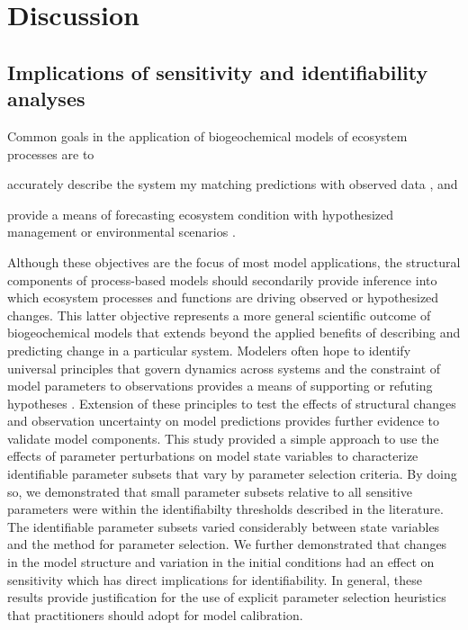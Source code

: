\documentclass[letterpaper,12pt,oneside]{article}\usepackage[]{graphicx}\usepackage[]{color}
\begin{document}
\section{Discussion}

\subsection{Implications of sensitivity and identifiability analyses}

Common goals in the application of biogeochemical models of ecosystem processes are to \begin{inparaenum}[1\upshape)]
\item accurately describe the system my matching predictions with observed data \citep{Reckhow90}, and 
\item provide a means of forecasting ecosystem condition with hypothesized management or environmental scenarios \citep{Clark01}. 
\end{inparaenum}
Although these objectives are the focus of most model applications, the structural components of process-based models should secondarily provide inference into which ecosystem processes and functions are driving observed or hypothesized changes.  This latter objective represents a more general scientific outcome of biogeochemical models that extends beyond the applied benefits of describing and predicting change in a particular system.  Modelers often hope to identify universal principles that govern dynamics across systems and the constraint of model parameters to observations provides a means of supporting or refuting hypotheses \citep{Kirchner06}.  Extension of these principles to test the effects of structural changes and observation uncertainty on model predictions provides further evidence to validate model components. This study provided a simple approach to use the effects of parameter perturbations on model state variables to characterize identifiable parameter subsets that vary by parameter selection criteria.  By doing so, we demonstrated that small parameter subsets relative to all sensitive parameters were within the identifiabilty thresholds described in the literature.  The identifiable parameter subsets varied considerably between state variables and the method for parameter selection.  We further demonstrated that changes in the model structure and variation in the initial conditions had an effect on sensitivity which has direct implications for identifiability. In general, these results provide justification for the use of explicit parameter selection heuristics that practitioners should adopt for model calibration.
\end{document}
